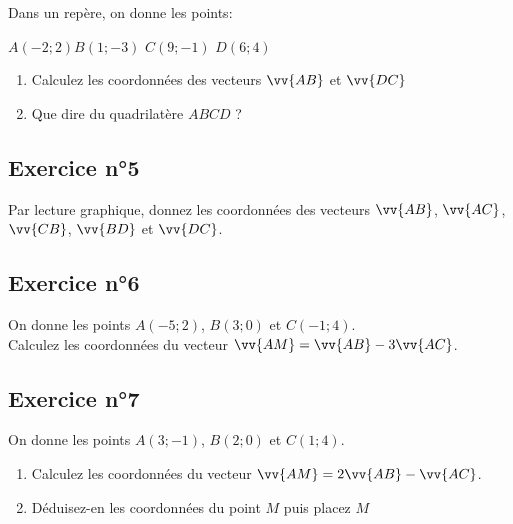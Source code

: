 \documentclass[12pt,a4paper]{article}
\begin{document}
Dans un repère, on donne les points:

$A(-2;2)$\qquad $B(1;-3)$ \qquad $C(9;-1)$ \qquad $D(6;4)$
\begin{enumerate}
    \item Calculez les coordonnées des vecteurs $\vv{AB}$ et $\vv{DC}$
    \item Que dire du quadrilatère $ABCD$ ?
\end{enumerate}

\subsection*{Exercice n°5}

Par lecture graphique, donnez les coordonnées des vecteurs $\vv{AB}$, $\vv{AC}$, $\vv{CB}$, $\vv{BD}$ et $\vv{DC}$.
\begin{center}
\end{center}

\subsection*{Exercice n°6}

On donne les points $A(-5;2)$, $B(3;0)$ et $C(-1;4)$.\\
Calculez les coordonnées du vecteur $\vv{AM}=\vv{AB}-3\vv{AC}$.

\subsection*{Exercice n°7}

On donne les points $A(3;-1)$, $B(2;0)$ et $C(1;4)$.

\begin{enumerate}
    \item Calculez les coordonnées du vecteur $\vv{AM}=2\vv{AB}-\vv{AC}$.
    \item Déduisez-en les coordonnées du point $M$ puis placez $M$ 
\end{enumerate}
\end{document}

